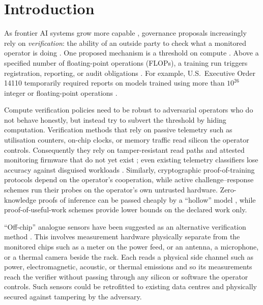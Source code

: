 \documentclass{article}
\theoremstyle{plain}
\theoremstyle{definition}
\theoremstyle{remark}
\begin{document}
\section{Introduction}
\label{sec:intro}

As frontier AI systems grow more capable
\citep{sevilla2022compute,bengio2026safetyreport}, governance proposals increasingly
rely on \emph{verification}: the ability of an outside party to check what a
monitored operator is doing \citep{reuel2025openproblems,baker2025verifying}. One proposed mechanism is a threshold on compute
\citep{sastry2024computing}. Above a specified number of floating-point
operations (FLOPs), a training run triggers registration, reporting, or audit
obligations \citep{shavit2023chinchilla,baker2025verifying,heim2024thresholds}. For example, U.S.~Executive Order 14110 temporarily required reports on models
trained using more than $10^{26}$ integer or floating-point operations
\citep{whitehouse2023eo14110,whitehouse2025eo14148}.


Compute verification policies need to be robust to adversarial
operators who do not behave honestly, but instead try to subvert the
threshold by hiding computation. Verification methods that rely on passive telemetry such as utilisation counters, on-chip clocks, or memory traffic read silicon the
operator controls.
Consequently they rely on  tamper-resistant read paths and attested
monitoring firmware that do not yet exist
\citep{ogara2025hardware,ansari2026hardware}; even existing telemetry
classifiers lose accuracy against disguised workloads \citep{rahman2026telemetry}.
Similarly, cryptographic proof-of-training protocols
\citep{jia2021proofoflearning,garg2023zkpot} depend on the operator's
cooperation, while active challenge--response schemes \citep{monfared2026timing}
run their probes on the operator's own untrusted hardware.
Zero-knowledge proofs of inference \citep{sun2024zkllm} can be passed
cheaply by a ``hollow'' model \citep{gong2026hollowllm}, while
proof-of-useful-work schemes \citep{pearl2026pouw} provide lower
bounds on the declared work only.

``Off-chip'' analogue sensors have been suggested as an alternative verification method
\citep{baker2025verifying}. This involves measurement hardware physically separate from
the monitored chips such as a meter on the power feed, or an antenna, a microphone, or a thermal camera beside the
rack. Each
reads a physical side channel such as power, electromagnetic, acoustic, or
thermal emissions and so its measurements reach the verifier without passing
through any silicon or software the operator controls. Such sensors could
be retrofitted to existing data centres and physically secured against
tampering by the adversary.
\end{document}
